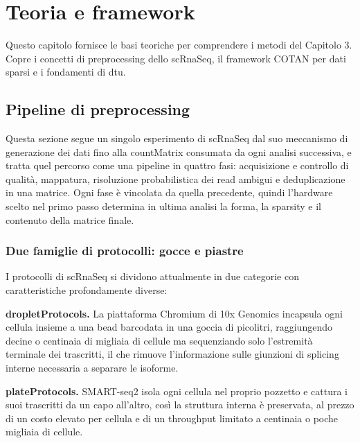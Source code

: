 \chapter{Teoria e framework}

Questo capitolo fornisce le basi teoriche per comprendere i metodi del Capitolo 3. Copre i concetti di preprocessing dello \gls{scRnaSeq}, il framework COTAN per dati sparsi e i fondamenti di \gls{dtu}.

\section{Pipeline di preprocessing}

Questa sezione segue un singolo esperimento di \gls{scRnaSeq} dal suo meccanismo di generazione dei dati fino alla \gls{countMatrix} consumata da ogni analisi successiva, e tratta quel percorso come una pipeline in quattro fasi: acquisizione e controllo di qualità, mappatura, risoluzione probabilistica dei read ambigui e deduplicazione in una matrice. Ogni fase è vincolata da quella precedente, quindi l'hardware scelto nel primo passo determina in ultima analisi la forma, la \gls{sparsity} e il contenuto della matrice finale.

\subsection{Due famiglie di protocolli: gocce e piastre}
I protocolli di \gls{scRnaSeq} si dividono attualmente in due categorie con caratteristiche profondamente diverse:

\textbf{\Gls{dropletProtocols}.} La piattaforma Chromium di 10x Genomics incapsula ogni cellula insieme a una bead barcodata in una goccia di picolitri, raggiungendo decine o centinaia di migliaia di cellule ma sequenziando solo l'estremità terminale dei trascritti, il che rimuove l'informazione sulle giunzioni di splicing interne necessaria a separare le isoforme.

\textbf{\Gls{plateProtocols}.} SMART-seq2 isola ogni cellula nel proprio pozzetto e cattura i suoi trascritti da un capo all'altro, così la struttura interna è preservata, al prezzo di un costo elevato per cellula e di un \gls{throughput} limitato a centinaia o poche migliaia di cellule.

